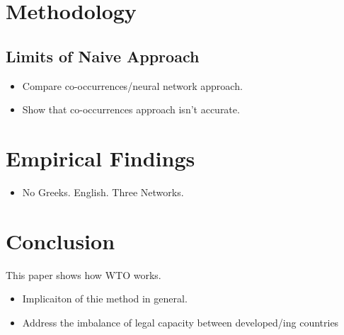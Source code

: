 \documentclass[12pt,letterpaper]{article}
\begin{document}
\section{Methodology}
\subsection{Limits of Naive Approach}

\begin{itemize}
  \item Compare co-occurrences/neural network approach.

  \item Show that co-occurrences approach isn't accurate.
\end{itemize}


\section{Empirical Findings}

\begin{itemize}
  \item No Greeks. English. Three Networks.
\end{itemize}



\section{Conclusion}
This paper shows how WTO works.

\begin{itemize}
  \item Implicaiton of thie method in general.
  \item Address the imbalance of legal capacity between developed/ing countries
\end{itemize}

\clearpage


\end{document}
